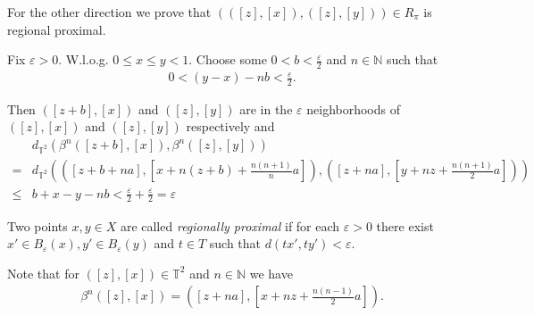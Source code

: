\begin{frame}
	For the other direction we prove that $(([z], [x]), ([z], [y])) \in R_\pi$ is regional proximal.
	\medskip
	
	Fix $\varepsilon > 0$. W.l.o.g. $0 \leq x \leq y < 1$. Choose some $0 < b < \frac{\varepsilon}{2}$ and $n \in \mathbb{N}$ such that
	\begin{align*}
		0 < (y-x) - nb < \frac{\varepsilon}{2}.
	\end{align*}
	\medskip
	
	Then $([z+b], [x])$ and $([z], [y])$ are in the $\varepsilon$ neighborhoods of $([z], [x])$ and $([z], [y])$ respectively and
	\begin{align*}
		&d_{\mathbb{T}^2}(\beta^n([z+b], [x]), \beta^n([z], [y]))\\
		= &d_{\mathbb{T}^2}(([z+b+na], [x + n(z+b) + \frac{n(n+1)}{n}a]), ([z+na], [y + nz + \frac{n(n+1)}{2}a]))\\
		\leq &b + x - y - nb < \frac{\varepsilon}{2} + \frac{\varepsilon}{2} = \varepsilon
	\end{align*}

	\begin{definition}
		Two points $x,y \in X$ are called \emph{regionally proximal}
		if for each $\varepsilon > 0$ there exist $x' \in B_\varepsilon(x), y' \in B_\varepsilon(y)$
		and $t \in T$ such that $d(tx', ty') < \varepsilon$.
	\end{definition}
	\begin{remark}
		Note that for $([z], [x]) \in \mathbb{T}^2$ and $n \in \mathbb{N}$ we have
		\begin{align*}
			\beta^n([z], [x]) = ([z+na], [x + nz + \frac{n(n-1)}{2}a]).
		\end{align*}
	\end{remark}
\end{frame}